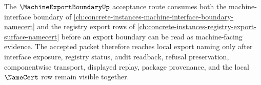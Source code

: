 The $\MachineExportBoundaryUp$ acceptance route consumes both the machine-interface boundary of \autoref{ch:concrete-instances-machine-interface-boundary-namecert} and the registry export rows of \autoref{ch:concrete-instances-registry-export-surface-namecert} before an export boundary can be read as machine-facing evidence. The accepted packet therefore reaches local export naming only after interface exposure, registry status, audit readback, refusal preservation, componentwise transport, displayed replay, package provenance, and the local $\NameCert$ row remain visible together.
